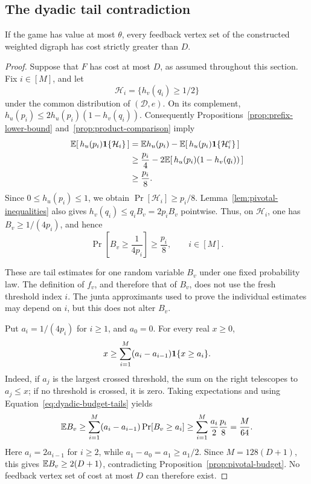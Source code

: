 \subsection{The dyadic tail contradiction}

\begin{proposition}
\label{prop:weighted-soundness}
If the game has value at most \(\theta\), every feedback vertex set
of the constructed weighted digraph has cost strictly greater
than \(D\).
\end{proposition}

\begin{proof}
Suppose that \(F\) has cost at most \(D\), as assumed throughout
this section.  Fix \(i\in[M]\), and let
\[
  \mathcal H_i=\{h_v(q_i)\ge1/2\}
\]
under the common distribution of \((\mathcal D,e)\).
On its complement,
\(h_u(p_i)\le2h_u(p_i)(1-h_v(q_i))\).  Consequently
Propositions~\ref{prop:prefix-lower-bound}
and~\ref{prop:product-comparison} imply
\begin{align*}
  \mathbb E[\,h_u(p_i)\mathbf 1\{\mathcal H_i\}\,]
  &=\mathbb E h_u(p_i)
       -\mathbb E[\,h_u(p_i)\mathbf 1\{\mathcal H_i^c\}\,]\\
  &\ge\frac{p_i}{4}
       -2\mathbb E[\,h_u(p_i)(1-h_v(q_i))\,]\\
  &\ge\frac{p_i}{8}.
\end{align*}
Since \(0\le h_u(p_i)\le1\), we obtain
\(\Pr[\mathcal H_i]\ge p_i/8\).
Lemma~\ref{lem:pivotal-inequalities} also gives
\(h_v(q_i)\le q_iB_v=2p_iB_v\) pointwise.
Thus, on \(\mathcal H_i\), one has \(B_v\ge1/(4p_i)\), and hence
\begin{equation}
\label{eq:dyadic-budget-tails}
  \Pr\!\left[B_v\ge\frac1{4p_i}\right]\ge\frac{p_i}{8},
  \qquad i\in[M].
\end{equation}

These are tail estimates for one random variable \(B_v\) under one
fixed probability law.  The definition of \(f_v\), and therefore
that of \(B_v\), does not use the fresh threshold index \(i\).
The junta approximants used to prove the individual estimates may
depend on \(i\), but this does not alter \(B_v\).

Put \(a_i=1/(4p_i)\) for \(i\ge1\), and \(a_0=0\).
For every real \(x\ge0\),
\[
  x\ge\sum_{i=1}^{M}(a_i-a_{i-1})\mathbf 1\{x\ge a_i\}.
\]
Indeed, if \(a_j\) is the largest crossed threshold, the sum on the
right telescopes to \(a_j\le x\); if no threshold is crossed, it
is zero.  Taking expectations and using
Equation~\eqref{eq:dyadic-budget-tails} yields
\[
  \mathbb E B_v
  \ge\sum_{i=1}^{M}(a_i-a_{i-1})\Pr[B_v\ge a_i]
  \ge\sum_{i=1}^{M}\frac{a_i}{2}\frac{p_i}{8}
  =\frac M{64}.
\]
Here \(a_i=2a_{i-1}\) for \(i\ge2\), while
\(a_1-a_0=a_1\ge a_1/2\).
Since \(M=128(D+1)\), this gives
\(\mathbb E B_v\ge2(D+1)\), contradicting
Proposition~\ref{prop:pivotal-budget}.
No feedback vertex set of cost at most \(D\) can therefore exist.
\end{proof}

